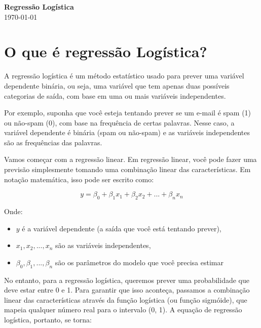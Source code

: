 \documentclass[12pt,a4paper, brazil]{article}
\begin{document}
\begin{center}
{\textbf {\huge Regressão Logística}}\\[5mm]
\today\\[5mm] %
\end{center}



\section{O que é regressão Logística?}

A regressão logística é um método estatístico usado para prever uma variável dependente binária, ou seja, uma variável que tem apenas duas possíveis categorias de saída, com base em uma ou mais variáveis independentes.

Por exemplo, suponha que você esteja tentando prever se um e-mail é spam (1) ou não-spam (0), com base na frequência de certas palavras. Nesse caso, a variável dependente é binária (spam ou não-spam) e as variáveis independentes são as frequências das palavras.

Vamos começar com a regressão linear. Em regressão linear, você pode fazer uma previsão simplesmente tomando uma combinação linear das características. Em notação matemática, isso pode ser escrito como:

\begin{equation}
  y = \beta_0 + \beta_1  x_1 + \beta_2  x_2 + ... + \beta_n  x_n
\end{equation}

\noindent Onde:

\begin{itemize}
  \item $y$ é a variável dependente (a saída que você está tentando prever),
  \item $x_1, x_2, ..., x_n$ são as variáveis independentes,
  \item $\beta_0, \beta_1, ..., \beta_n$ são os parâmetros do modelo que você precisa estimar
\end{itemize}


No entanto, para a regressão logística, queremos prever uma probabilidade que deve estar entre 0 e 1. Para garantir que isso aconteça, passamos a combinação linear das características através da função logística (ou função sigmóide), que mapeia qualquer número real para o intervalo (0, 1). A equação de regressão logística, portanto, se torna:
\end{document}
